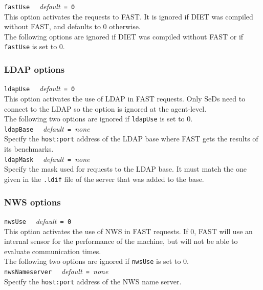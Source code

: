 \noindent
\texttt{fastUse} \ \ \emph{default}\texttt{ = 0}\\ This option
activates the requests to FAST. It is ignored if DIET was compiled
without FAST, and defaults to 0 otherwise. \\

The following options are ignored if DIET was compiled without FAST or if
\texttt{fastUse} is set to 0.

\subsubsection{LDAP options}

\noindent
\texttt{ldapUse} \ \ \emph{default}\texttt{ = 0} \\
This option activates the use of LDAP in FAST requests.  Only SeDs
need to connect to the LDAP so the option is ignored at the agent-level. \\

The following two options are ignored if \texttt{ldapUse} is set to 0.
\\

\noindent
\texttt{ldapBase} \ \ \emph{default}\texttt{ = }\emph{none}\\ Specify
the \texttt{host:port} address of the LDAP base where FAST gets the
results of its benchmarks.  \\

\noindent
\texttt{ldapMask} \ \ \emph{default}\texttt{ = }\emph{none}\\ Specify
the mask used for requests to the LDAP base. It must match the one
given in the \texttt{.ldif} file of the server that was added to the
base.


\subsubsection{NWS options}

\noindent
\texttt{nwsUse} \ \ \emph{default}\texttt{ = 0}\\ This option
activates the use of NWS in FAST requests. If 0, FAST will use an
internal sensor for the performance of the machine, but will not be
able to evaluate communication times.  \\

The following two options are ignored if \texttt{nwsUse} is set to 0.
\\

\noindent
\texttt{nwsNameserver} \ \ \emph{default}\texttt{ = }\emph{none}\\
Specify the \texttt{host:port} address of the NWS name server.
\\

